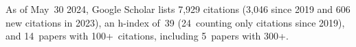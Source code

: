 %
As of May~30 2024, Google Scholar lists
7,929 citations (3,046 since 2019 and 606 new citations in 2023),
an h-index of~39 (24~counting only citations since 2019),
and 14~papers with 100+~citations, including 5~papers with 300+.
